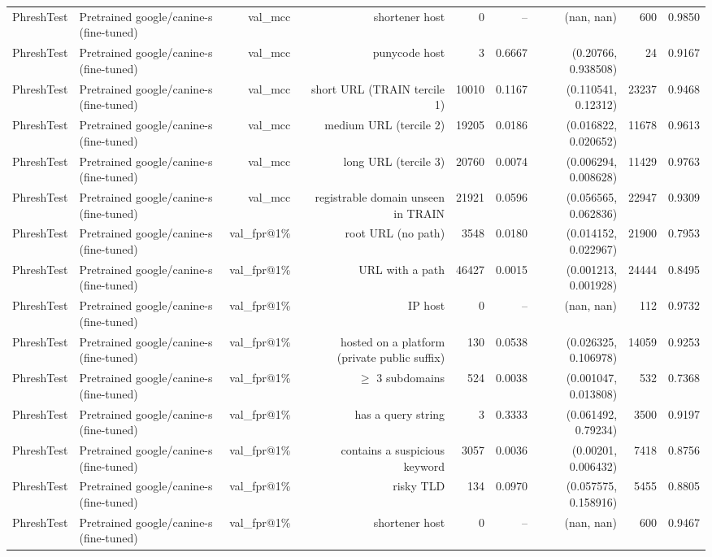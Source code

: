 \begin{table}[t]
\begin{tabular}{llrrrrrrr}
PhreshTest & Pretrained google/canine-s (fine-tuned) & val\_mcc & shortener host & 0 & -- & (nan, nan) & 600 & 0.9850 \\
PhreshTest & Pretrained google/canine-s (fine-tuned) & val\_mcc & punycode host & 3 & 0.6667 & (0.20766, 0.938508) & 24 & 0.9167 \\
PhreshTest & Pretrained google/canine-s (fine-tuned) & val\_mcc & short URL (TRAIN tercile 1) & 10010 & 0.1167 & (0.110541, 0.12312) & 23237 & 0.9468 \\
PhreshTest & Pretrained google/canine-s (fine-tuned) & val\_mcc & medium URL (tercile 2) & 19205 & 0.0186 & (0.016822, 0.020652) & 11678 & 0.9613 \\
PhreshTest & Pretrained google/canine-s (fine-tuned) & val\_mcc & long URL (tercile 3) & 20760 & 0.0074 & (0.006294, 0.008628) & 11429 & 0.9763 \\
PhreshTest & Pretrained google/canine-s (fine-tuned) & val\_mcc & registrable domain unseen in TRAIN & 21921 & 0.0596 & (0.056565, 0.062836) & 22947 & 0.9309 \\
PhreshTest & Pretrained google/canine-s (fine-tuned) & val\_fpr@1\% & root URL (no path) & 3548 & 0.0180 & (0.014152, 0.022967) & 21900 & 0.7953 \\
PhreshTest & Pretrained google/canine-s (fine-tuned) & val\_fpr@1\% & URL with a path & 46427 & 0.0015 & (0.001213, 0.001928) & 24444 & 0.8495 \\
PhreshTest & Pretrained google/canine-s (fine-tuned) & val\_fpr@1\% & IP host & 0 & -- & (nan, nan) & 112 & 0.9732 \\
PhreshTest & Pretrained google/canine-s (fine-tuned) & val\_fpr@1\% & hosted on a platform (private public suffix) & 130 & 0.0538 & (0.026325, 0.106978) & 14059 & 0.9253 \\
PhreshTest & Pretrained google/canine-s (fine-tuned) & val\_fpr@1\% & $\geq$ 3 subdomains & 524 & 0.0038 & (0.001047, 0.013808) & 532 & 0.7368 \\
PhreshTest & Pretrained google/canine-s (fine-tuned) & val\_fpr@1\% & has a query string & 3 & 0.3333 & (0.061492, 0.79234) & 3500 & 0.9197 \\
PhreshTest & Pretrained google/canine-s (fine-tuned) & val\_fpr@1\% & contains a suspicious keyword & 3057 & 0.0036 & (0.00201, 0.006432) & 7418 & 0.8756 \\
PhreshTest & Pretrained google/canine-s (fine-tuned) & val\_fpr@1\% & risky TLD & 134 & 0.0970 & (0.057575, 0.158916) & 5455 & 0.8805 \\
PhreshTest & Pretrained google/canine-s (fine-tuned) & val\_fpr@1\% & shortener host & 0 & -- & (nan, nan) & 600 & 0.9467 \\

\end{tabular}
\end{table}
